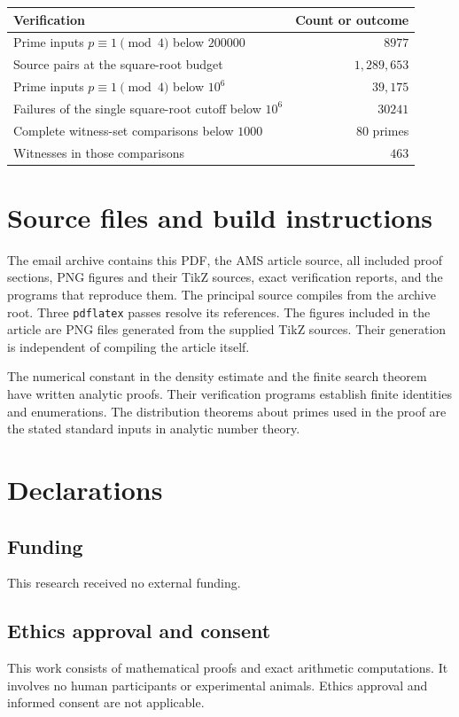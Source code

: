 \documentclass[11pt,a4paper]{amsart}
\theoremstyle{definition}\newtheorem{definition}[theorem]{Definition}
\begin{document}
\begin{center}
\begin{tabular}{@{}lr@{}}
\toprule
Verification & Count or outcome\\
\midrule
Prime inputs $p\equiv1\pmod4$ below $200000$ & $8977$\\
Source pairs at the square-root budget & $1{,}289{,}653$\\
Prime inputs $p\equiv1\pmod4$ below $10^6$ & $39{,}175$\\
Failures of the single square-root cutoff below $10^6$ & $30241$\\
Complete witness-set comparisons below $1000$ & $80$ primes\\
Witnesses in those comparisons & $463$\\
\bottomrule
\end{tabular}
\end{center}

\section{Source files and build instructions}
The email archive contains this PDF, the AMS article source,
all included proof sections, PNG figures and their TikZ sources,
exact verification reports, and the programs that reproduce them.
The principal source compiles from the archive root. Three
\texttt{pdflatex} passes resolve its references. The figures
included in the article are PNG files generated from the supplied
TikZ sources. Their generation is independent of compiling the
article itself.

The numerical constant in the density estimate and the finite
search theorem have written analytic proofs. Their verification
programs establish finite identities and enumerations. The
distribution theorems about primes used in the proof are the
stated standard inputs in analytic number theory.


\section*{Declarations}

\subsection*{Funding}
This research received no external funding.

\subsection*{Ethics approval and consent}
This work consists of mathematical proofs and exact arithmetic
computations. It involves no human participants or experimental animals.
Ethics approval and informed consent are not applicable.
\end{document}
